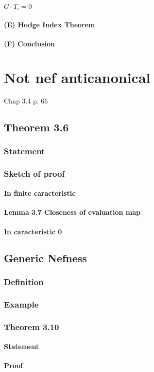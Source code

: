 \paragraph*{$G \cdot T_i = 0$}
\paragraph*{(E) Hodge Index Theorem}
\paragraph*{(F) Conclusion}
\section{Not nef anticanonical}
Chap 3.4
p. 66
\subsection{Theorem 3.6}
\subsubsection{Statement}
\subsubsection{Sketch of proof}
\paragraph*{In finite caracteristic}
\paragraph*{Lemma 3.7
Closeness of evaluation map}
\paragraph*{In caracteristic 0}
\subsection{Generic Nefness}
\subsubsection{Definition}
\subsubsection{Example}
\subsubsection{Theorem 3.10}
\paragraph*{Statement}
\paragraph*{Proof}
